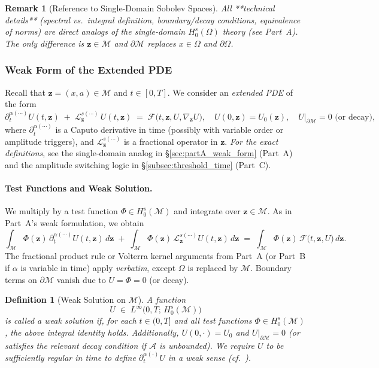 \documentclass[12pt]{article}
\newtheorem{remark}[theorem]{Remark}
\newtheorem{definition}[theorem]{Definition}
\begin{document}
\begin{remark}[Reference to Single-Domain Sobolev Spaces]
All **technical details** (spectral vs.\ integral definition, boundary/decay conditions, 
equivalence of norms) are \emph{direct} analogs of the single-domain $H_0^s(\Omega)$ 
theory (see Part~A). The only difference is $\mathbf{z}\in\mathcal{M}$ and 
$\partial\mathcal{M}$ replaces $x\in\Omega$ and $\partial\Omega$.
\end{remark}

\subsubsection{Weak Form of the Extended PDE}
\label{subsubsec:weak_form_M}

Recall that \(\mathbf{z}=(x,a)\in \mathcal{M}\) and $t\in[0,T]$. We consider an 
\emph{extended PDE} of the form
\[
\partial_t^{\alpha(\cdots)} U(t,\mathbf{z})
\;+\;
\mathcal{L}_{\mathbf{z}}^{s(\cdots)} \,U(t,\mathbf{z})
\;=\;
\mathcal{F}\bigl(t,\mathbf{z},U,\nabla_{\mathbf{z}}U\bigr),
\quad
U(0,\mathbf{z})=U_0(\mathbf{z}),
\quad
U|_{\partial\mathcal{M}}=0 \text{ (or decay)},
\]
where $\partial_t^{\alpha(\cdots)}$ is a Caputo derivative in time (possibly with 
variable order or amplitude triggers), and 
$\mathcal{L}_{\mathbf{z}}^{s(\cdots)}$ is a fractional operator in $\mathbf{z}$. 
\emph{For the exact definitions}, see the single-domain analog in \S\ref{sec:partA_weak_form} 
(Part~A) and the amplitude switching logic in \S\ref{subsec:threshold_time} (Part~C).

\paragraph{Test Functions and Weak Solution.}
We multiply by a test function $\Phi\in H_0^s(\mathcal{M})$ and integrate over 
$\mathbf{z}\in \mathcal{M}$. As in Part~A’s weak formulation, we obtain
\[
\int_{\mathcal{M}}
  \Phi(\mathbf{z})\,\partial_t^{\alpha(\cdots)}U(t,\mathbf{z})
  \,d\mathbf{z}
\;+\;
\int_{\mathcal{M}}
  \Phi(\mathbf{z})\,\mathcal{L}_{\mathbf{z}}^{s(\cdots)}U(t,\mathbf{z})
  \,d\mathbf{z}
\;=\;
\int_{\mathcal{M}}
  \Phi(\mathbf{z})\,\mathcal{F}\bigl(t,\mathbf{z},U\bigr)\,d\mathbf{z}.
\]
The fractional product rule or Volterra kernel arguments from Part~A (or Part~B if $\alpha$ 
is variable in time) apply \emph{verbatim}, except $\Omega$ is replaced by $\mathcal{M}$. 
Boundary terms on $\partial\mathcal{M}$ vanish due to $U=\Phi=0$ (or decay).

\begin{definition}[Weak Solution on \(\mathcal{M}\)]
\label{def:weak_soln_extended}
A function 
\[
U \;\in\; L^\infty\bigl(0,T;\,H_0^s(\mathcal{M})\bigr)
\]
is called a \emph{weak solution} if, for each $t\in(0,T]$ and all test functions 
$\Phi\in H_0^s(\mathcal{M})$, the above integral identity holds. Additionally, $U(0,\cdot)=U_0$ 
and $U\big|_{\partial\mathcal{M}}=0$ (or satisfies the relevant decay condition if $\mathcal{A}$ 
is unbounded). We require $U$ to be sufficiently regular in time to define 
$\partial_t^{\alpha(\cdot)}U$ in a weak sense (cf.\ \cite{Diethelm2010,Kilbas2006}).
\end{definition}
\end{document}
